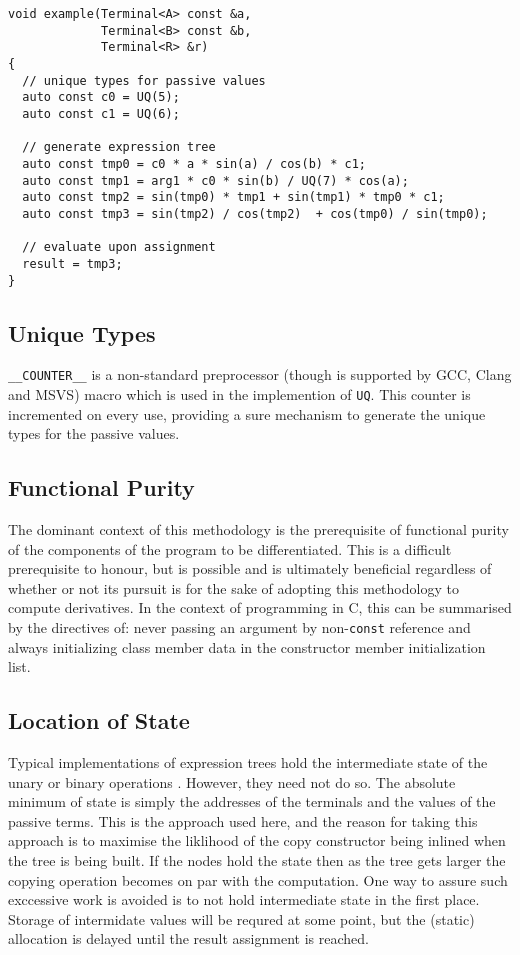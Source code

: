 \documentclass[a4paper,10pt]{article}
\def\CC{{C\nolinebreak[4]\hspace{-.05em}\raisebox{.4ex}{\tiny\bf ++}}}
\begin{document}
\begin{lstlisting}[caption={All terminal nodes require unique types, both for active and passive values.}, label=lst:example]
void example(Terminal<A> const &a,
             Terminal<B> const &b,
             Terminal<R> &r)
{
  // unique types for passive values
  auto const c0 = UQ(5);
  auto const c1 = UQ(6);

  // generate expression tree
  auto const tmp0 = c0 * a * sin(a) / cos(b) * c1;
  auto const tmp1 = arg1 * c0 * sin(b) / UQ(7) * cos(a);
  auto const tmp2 = sin(tmp0) * tmp1 + sin(tmp1) * tmp0 * c1;
  auto const tmp3 = sin(tmp2) / cos(tmp2)  + cos(tmp0) / sin(tmp0);

  // evaluate upon assignment
  result = tmp3;
}
\end{lstlisting}

\subsection{Unique Types}
\texttt{\_\_COUNTER\_\_} is a non-standard preprocessor (though is supported by GCC, Clang and MSVS) macro which is used in the implemention of \texttt{UQ\(\)}. This counter is incremented on every use, providing a sure mechanism to generate the unique types for the passive values.

\subsection{Functional Purity}
The dominant context of this methodology is the prerequisite of functional purity of the components of the program to be differentiated. This is a difficult prerequisite to honour, but is possible and is ultimately beneficial regardless of whether or not its pursuit is for the sake of adopting this methodology to compute derivatives. In the context of programming in {\CC}, this can be summarised by the directives of: never passing an argument by non-\texttt{const} reference and always initializing class member data in the constructor member initialization list.

\subsection{Location of State}
Typical implementations of expression trees hold the intermediate state of the unary or binary operations \citep{Hogan2014FRM}. However, they need not do so. The absolute minimum of state is simply the addresses of the terminals and the values of the passive terms. This is the approach used here, and the reason for taking this approach is to maximise the liklihood of the copy constructor being inlined when the tree is being built. If the nodes hold the state then as the tree gets larger the copying operation becomes on par with the computation. One way to assure such exccessive work is avoided is to not hold intermediate state in the first place. Storage of intermidate values will be requred at some point, but the (static) allocation is delayed until the result assignment is reached.
\end{document}
